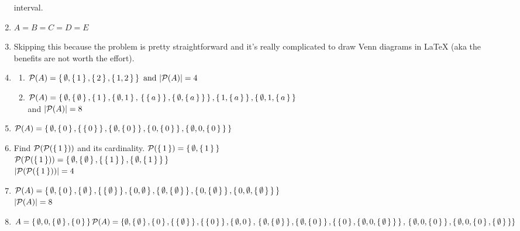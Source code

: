 \documentclass[12pt]{article}
\begin{document}
\begin{enumerate}[label=1.\arabic*]
    interval.
    \item $A=B=C=D=E$
    \item Skipping this because the problem is pretty straightforward and it's really
    complicated to draw Venn diagrams in LaTeX (aka the benefits are not worth the effort).
    \item
      \begin{enumerate}[label=(\alph*)]
        \item $\mathcal{P}\qty(A)=\set{\emptyset,\set{1},\set{2},\set{1,2}}
        \text{ and } \abs{\mathcal{P}\qty(A)}=4$
        \item $\mathcal{P}\qty(A)=\set{\emptyset,\set{\emptyset},\set{1},\set{\emptyset,1}, \\
        \set{\set{a}}, \set{\emptyset, \set{a}}}, \set{1, \set{a}}, \set{\emptyset, 1, \set{a}}$ \\
         and $\abs{\mathcal{P}\qty(A)}=8$
      \end{enumerate}
    \item $\mathcal{P}\qty(A)=\set{\emptyset, \set{0}, \set{\set{0}}, \set{\emptyset,
      \set{0}}, \set{0, \set{0}}, \set{\emptyset, 0, \set{0}}}$
    \item Find $\mathcal{P}\qty(\mathcal{P}\qty(\set{ 1 }))$ and its cardinality.
      $\mathcal{P}\qty(\set{1})=\set{\emptyset,\set{1}}$ \\
      $\mathcal{P}\qty(\mathcal{P}\qty(\set{1}))=\set{\emptyset, \set{\emptyset}, \set{\set{1}}, \set{\emptyset, \set{1}}}$ \\
      $\abs{\mathcal{P}\qty(\mathcal{P}\qty(\set{1}))}=4$
    \item $\mathcal{P}\qty(A)=\set{\emptyset, \set{0}, \set{\emptyset},
    \set{\set{\emptyset}}, \set{0, \emptyset}, \set{\emptyset, \set{\emptyset}},\set{0, \set{\emptyset}},
    \set{0, \emptyset, \set{\emptyset}}}$ \\
    $\abs{\mathcal{P}\qty(A)}=8$
    \item \begin{math}
      A=\set{\emptyset, 0, \set{\emptyset}, \set{0}} \\
      \mathcal{P}\qty(A)=\{ \emptyset, \set{\emptyset}, \set{0}, \set{\set{\emptyset}}, \set{\set{0}}, \set{\emptyset, 0},\\
      \set{\emptyset, \set{\emptyset}}, \set{\emptyset, \set{0}}, \set{\set{0}, \set{\emptyset, 0, \set{\emptyset}}}, \\
      \set{\emptyset, 0, \set{0}}, \set{\emptyset, 0, \set{0}, \set{\emptyset}} \} \\

\end{math}
\end{enumerate}
\end{document}
